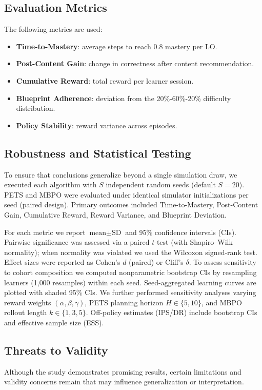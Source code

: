 \documentclass[preprint,12pt]{elsarticle}
\begin{document}
\begin{frontmatter}
\subsection{Evaluation Metrics}
The following metrics are used:
\begin{itemize}
\item \textbf{Time-to-Mastery}: average steps to reach 0.8 mastery per LO.
\item \textbf{Post-Content Gain}: change in correctness after content recommendation.
\item \textbf{Cumulative Reward}: total reward per learner session.
\item \textbf{Blueprint Adherence}: deviation from the 20\%-60\%-20\% difficulty distribution.
\item \textbf{Policy Stability}: reward variance across episodes.
\end{itemize}

\subsection{Robustness and Statistical Testing}
To ensure that conclusions generalize beyond a single simulation draw, we executed each algorithm with $S$ independent random seeds (default $S=20$). PETS and MBPO were evaluated under identical simulator initializations per seed (paired design). Primary outcomes included Time-to-Mastery, Post-Content Gain, Cumulative Reward, Reward Variance, and Blueprint Deviation.

For each metric we report $\text{mean}\pm\text{SD}$ and 95\% confidence intervals (CIs). Pairwise significance was assessed via a paired $t$-test (with Shapiro–Wilk normality); when normality was violated we used the Wilcoxon signed-rank test. Effect sizes were reported as Cohen’s $d$ (paired) or Cliff’s $\delta$. To assess sensitivity to cohort composition we computed nonparametric bootstrap CIs by resampling learners (1{,}000 resamples) within each seed. Seed-aggregated learning curves are plotted with shaded 95\% CIs. We further performed sensitivity analyses varying reward weights $(\alpha,\beta,\gamma)$, PETS planning horizon $H\in\{5,10\}$, and MBPO rollout length $k\in\{1,3,5\}$. Off-policy estimates (IPS/DR) include bootstrap CIs and effective sample size (ESS).
\subsection{Threats to Validity}
Although the study demonstrates promising results, certain limitations and validity concerns remain that may influence generalization or interpretation.


\end{frontmatter}
\end{document}
